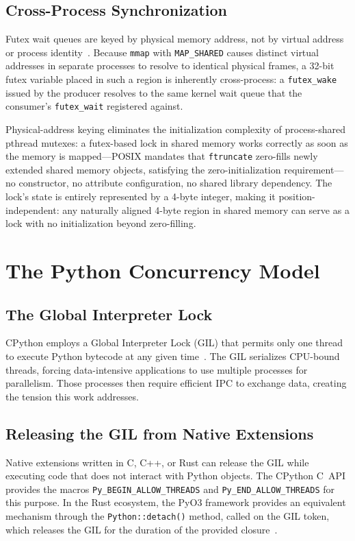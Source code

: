 \subsection{Cross-Process Synchronization}

Futex wait queues are keyed by physical memory address, not by virtual address or process identity~\cite{franke2002}. Because \texttt{mmap} with \texttt{MAP\_SHARED} causes distinct virtual addresses in separate processes to resolve to identical physical frames, a 32-bit futex variable placed in such a region is inherently cross-process: a \texttt{futex\_wake} issued by the producer resolves to the same kernel wait queue that the consumer's \texttt{futex\_wait} registered against.

Physical-address keying eliminates the initialization complexity of process-shared pthread mutexes: a futex-based lock in shared memory works correctly as soon as the memory is mapped---POSIX mandates that \texttt{ftruncate} zero-fills newly extended shared memory objects, satisfying the zero-initialization requirement---no constructor, no attribute configuration, no shared library dependency. The lock's state is entirely represented by a 4-byte integer, making it position-independent: any naturally aligned 4-byte region in shared memory can serve as a lock with no initialization beyond zero-filling.

\section{The Python Concurrency Model}
\label{sec:python_concurrency}

\subsection{The Global Interpreter Lock}

CPython employs a Global Interpreter Lock (GIL) that permits only one thread to execute Python bytecode at any given time~\cite{python_gil}. The GIL serializes CPU-bound threads, forcing data-intensive applications to use multiple processes for parallelism. Those processes then require efficient IPC to exchange data, creating the tension this work addresses.

\subsection{Releasing the GIL from Native Extensions}

Native extensions written in C, C++, or Rust can release the GIL while executing code that does not interact with Python objects. The CPython C~API provides the macros \texttt{Py\_BEGIN\_ALLOW\_THREADS} and \texttt{Py\_END\_ALLOW\_THREADS} for this purpose. In the Rust ecosystem, the PyO3 framework provides an equivalent mechanism through the \texttt{Python::detach()} method, called on the GIL token, which releases the GIL for the duration of the provided closure~\cite{pyo3}.

